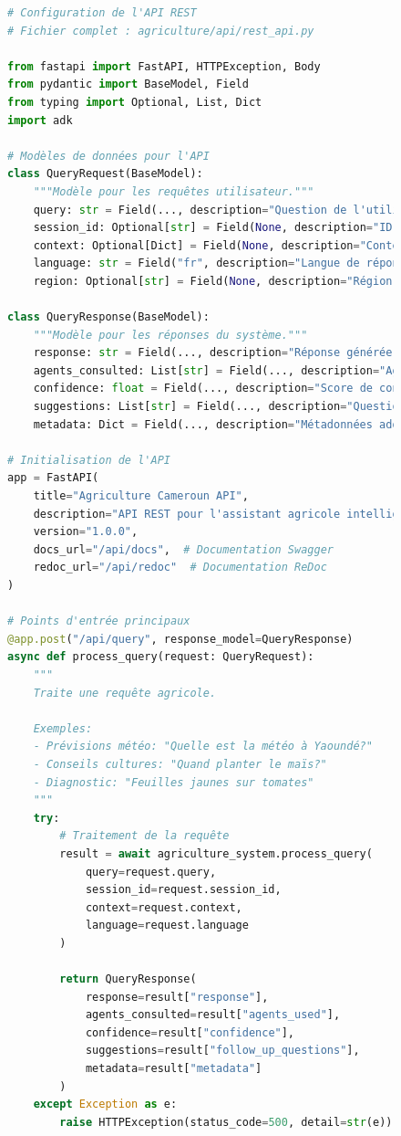 \begin{figure}[H]
\centering
\begin{lstlisting}[language=Python, caption=Points d'entrée de l'API REST]
# Configuration de l'API REST
# Fichier complet : agriculture/api/rest_api.py

from fastapi import FastAPI, HTTPException, Body
from pydantic import BaseModel, Field
from typing import Optional, List, Dict
import adk

# Modèles de données pour l'API
class QueryRequest(BaseModel):
    """Modèle pour les requêtes utilisateur."""
    query: str = Field(..., description="Question de l'utilisateur")
    session_id: Optional[str] = Field(None, description="ID de session")
    context: Optional[Dict] = Field(None, description="Contexte additionnel")
    language: str = Field("fr", description="Langue de réponse")
    region: Optional[str] = Field(None, description="Région spécifique")

class QueryResponse(BaseModel):
    """Modèle pour les réponses du système."""
    response: str = Field(..., description="Réponse générée")
    agents_consulted: List[str] = Field(..., description="Agents consultés")
    confidence: float = Field(..., description="Score de confiance")
    suggestions: List[str] = Field(..., description="Questions suggérées")
    metadata: Dict = Field(..., description="Métadonnées additionnelles")

# Initialisation de l'API
app = FastAPI(
    title="Agriculture Cameroun API",
    description="API REST pour l'assistant agricole intelligent",
    version="1.0.0",
    docs_url="/api/docs",  # Documentation Swagger
    redoc_url="/api/redoc"  # Documentation ReDoc
)

# Points d'entrée principaux
@app.post("/api/query", response_model=QueryResponse)
async def process_query(request: QueryRequest):
    """
    Traite une requête agricole.

    Exemples:
    - Prévisions météo: "Quelle est la météo à Yaoundé?"
    - Conseils cultures: "Quand planter le maïs?"
    - Diagnostic: "Feuilles jaunes sur tomates"
    """
    try:
        # Traitement de la requête
        result = await agriculture_system.process_query(
            query=request.query,
            session_id=request.session_id,
            context=request.context,
            language=request.language
        )

        return QueryResponse(
            response=result["response"],
            agents_consulted=result["agents_used"],
            confidence=result["confidence"],
            suggestions=result["follow_up_questions"],
            metadata=result["metadata"]
        )
    except Exception as e:
        raise HTTPException(status_code=500, detail=str(e))


\end{lstlisting}
\end{figure}
